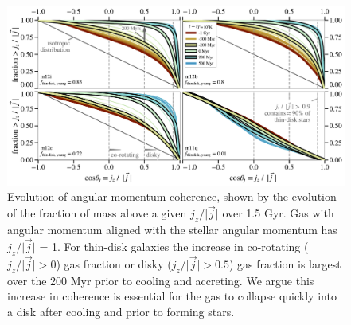 \documentclass[fleqn,usenatbib]{mnras}
\begin{document}
\begin{figure}
    \centering
    \includegraphics[width=\textwidth]{figures/jzjmag_vs_t.pdf}
    \caption{
    Evolution of angular momentum coherence, shown by the evolution of the fraction of mass above a given $j_z / \vert \vec j \vert$ over 1.5 Gyr.
    Gas with angular momentum aligned with the stellar angular momentum has $j_z / \vert \vec j \vert$ = 1.
    For thin-disk galaxies the increase in co-rotating ($j_z/\vert \vec j \vert > 0$) gas fraction or disky ($j_z/\vert \vec j \vert > 0.5$) gas fraction is largest over the 200 Myr prior to cooling and accreting.
    We argue this increase in coherence is essential for the gas to collapse quickly into a disk after cooling and prior to forming stars.
    }
    \label{f: coherence}
\end{figure}
\end{document}
